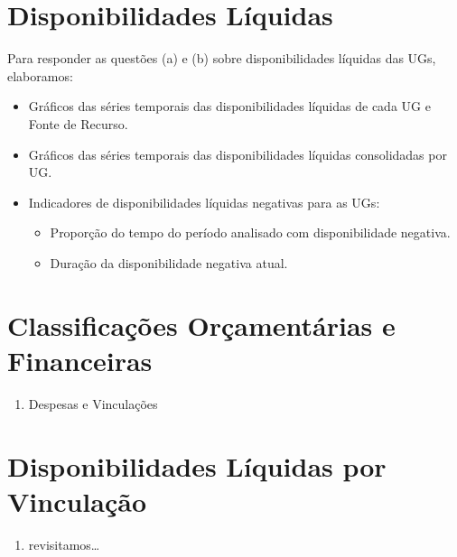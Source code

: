 \documentclass[]{book}
\providecommand{\tightlist}{%
  \setlength{\itemsep}{0pt}\setlength{\parskip}{0pt}}
\begin{document}
\hypertarget{disponibilidades-liquidas}{%
\section{Disponibilidades Líquidas}\label{disponibilidades-liquidas}}

Para responder as questões (a) e (b) sobre disponibilidades líquidas das UGs, elaboramos:

\begin{itemize}
\tightlist
\item
  Gráficos das séries temporais das disponibilidades líquidas de cada UG e Fonte de Recurso.
\item
  Gráficos das séries temporais das disponibilidades líquidas consolidadas por UG.
\item
  Indicadores de disponibilidades líquidas negativas para as UGs:

  \begin{itemize}
  \tightlist
  \item
    Proporção do tempo do período analisado com disponibilidade negativa.
  \item
    Duração da disponibilidade negativa atual.
  \end{itemize}
\end{itemize}

\hypertarget{classificacoes-orcamentarias-e-financeiras}{%
\section{Classificações Orçamentárias e Financeiras}\label{classificacoes-orcamentarias-e-financeiras}}

\begin{enumerate}
\def\labelenumi{(\alph{enumi})}
\setcounter{enumi}{2}
\tightlist
\item
  Despesas e Vinculações
\end{enumerate}

\hypertarget{disponibilidades-liquidas-por-vinculacao}{%
\section{Disponibilidades Líquidas por Vinculação}\label{disponibilidades-liquidas-por-vinculacao}}

\begin{enumerate}
\def\labelenumi{(\alph{enumi})}
\setcounter{enumi}{3}
\tightlist
\item
  revisitamos\ldots{}
\end{enumerate}
\end{document}
